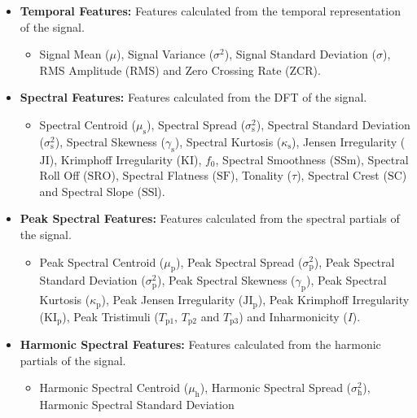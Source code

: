 		\begin{itemize}
			\item {\bf{Temporal Features:}} Features calculated from the temporal representation of the signal.
			\begin{itemize}
				\item Signal Mean ($\mu$), Signal Variance ($\sigma^{2}$), Signal Standard Deviation
				      ($\sigma$), RMS Amplitude ($\textrm{RMS}$) and Zero Crossing Rate ($\textrm{ZCR}$).
			\end{itemize}
			\item {\bf{Spectral Features:}} Features calculated from the DFT of the signal.
			\begin{itemize}
				\item Spectral Centroid ($\mu_{\textrm{s}}$), Spectral Spread ($\sigma_{\textrm{s}}^{2}$),
				      Spectral Standard Deviation ($\sigma_{\textrm{s}}^{2}$), Spectral Skewness
				      ($\gamma_{\textrm{s}}$), Spectral Kurtosis ($\kappa_{\textrm{s}}$), Jensen
				      Irregularity ($\textrm{JI}$), Krimphoff Irregularity ($\textrm{KI}$), $f_{0}$,
				      Spectral Smoothness ($\textrm{SSm}$), Spectral Roll Off ($\textrm{SRO}$), Spectral
				      Flatness ($\textrm{SF}$), Tonality ($\tau$), Spectral Crest ($\textrm{SC}$)
				      and Spectral Slope ($\textrm{SSl}$).
			\end{itemize}
			\item {\bf{Peak Spectral Features:}} Features calculated from the spectral partials of the signal.
			\begin{itemize}
				\item Peak Spectral Centroid ($\mu_{\textrm{p}}$), Peak Spectral Spread
				      ($\sigma_{\textrm{p}}^{2}$), Peak Spectral Standard Deviation
				      ($\sigma_{\textrm{p}}^{2}$), Peak Spectral Skewness ($\gamma_{\textrm{p}}$), Peak
				      Spectral Kurtosis ($\kappa_{\textrm{p}}$), Peak Jensen Irregularity
				      ($\textrm{JI}_{\textrm{p}}$), Peak Krimphoff Irregularity
				      ($\textrm{KI}_{\textrm{p}}$), Peak Tristimuli ($T_{\textrm{p}1}$, $T_{\textrm{p}2}$
				      and $T_{\textrm{p}3}$) and Inharmonicity ($I$).
			\end{itemize}
			\item {\bf{Harmonic Spectral Features:}} Features calculated from the harmonic partials of the
			      signal.
			\begin{itemize}
				\item Harmonic Spectral Centroid ($\mu_{\textrm{h}}$), Harmonic Spectral Spread
				      ($\sigma_{\textrm{h}}^{2}$), Harmonic Spectral Standard Deviation

\end{itemize}
\end{itemize}
